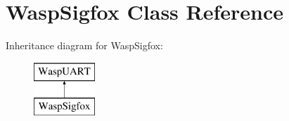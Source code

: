 \hypertarget{class_wasp_sigfox}{}\section{Wasp\+Sigfox Class Reference}
\label{class_wasp_sigfox}
Inheritance diagram for Wasp\+Sigfox\+:\begin{figure}[H]
\begin{center}
\leavevmode
\includegraphics[height=2.000000cm]{class_wasp_sigfox}
\end{center}
\end{figure}
